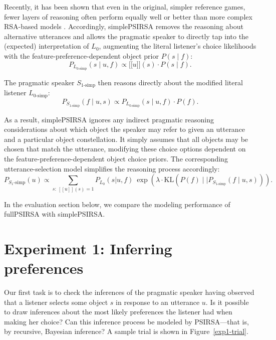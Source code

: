 \documentclass[11pt,a4paper]{article}
\newcommand{\sem}[1]{\mbox{$[\![$#1$]\!]$}}
\begin{document}
Recently, it has been shown that even in the original, simpler reference games, fewer layers of reasoning often perform equally well or better than more complex RSA-based models \cite{sikos2019}.
Accordingly, simplePSIRSA removes the reasoning about alternative utterances and allows the pragmatic speaker to directly tap into the (expected) interpretation of $L_0$, augmenting the literal listener's choice likelihoods with the feature-preference-dependent object prior $P(s\mid f)$:
\begin{equation}
P_{L_{0\textrm{-simp}}}(s\mid u,f) \propto \sem{$u$}(s) \cdot P(s\mid f).
\end{equation}

The pragmatic speaker $S_{1\textrm{-simp}}$ then reasons directly about the modified literal listener $L_{0\textrm{-simp}}$: 
\begin{equation}
P_{S_{1\textrm{-simp}}}(f\mid u,s) \propto P_{L_{0\textrm{-simp}}}(s\mid u,f) \cdot P(f).
\end{equation}

As a result, simplePSIRSA ignores any indirect pragmatic reasoning considerations about which object the speaker may refer to given an utterance and a particular object constellation.
It simply assumes that all objects may be chosen that match the utterance, modifying these choice options dependent on the feature-preference-dependent object choice priors. The corresponding utterance-selection model simplifies the reasoning process accordingly:
\begin{equation}
P_{S_1\textrm{-simp}}(u) \propto \sum_{s:\  [\![u]\!](s)=1} P_{L_0}(s|u,f)\ \exp(\lambda \cdot \textrm{KL}(P(f)\mid\mid P_{S_{1\textrm{-simp}}}(f\mid u,s))).
\label{eq:kldivlambdasimp}
\end{equation}

In the evaluation section below, we compare the modeling performance of fullPSIRSA with simplePSIRSA. 


\section{Experiment 1: Inferring preferences} \label{experiment1}

Our first task is to check the inferences of the pragmatic speaker having observed that a listener selects some object $s$ in response to an utterance $u$. 
Is it possible to draw inferences about the most likely preferences the listener had when making her choice? 
Can this inference process be modeled by PSIRSA---that is, by recursive, Bayesian inference?
A sample trial is shown in Figure~\ref{exp1-trial}.
\end{document}
